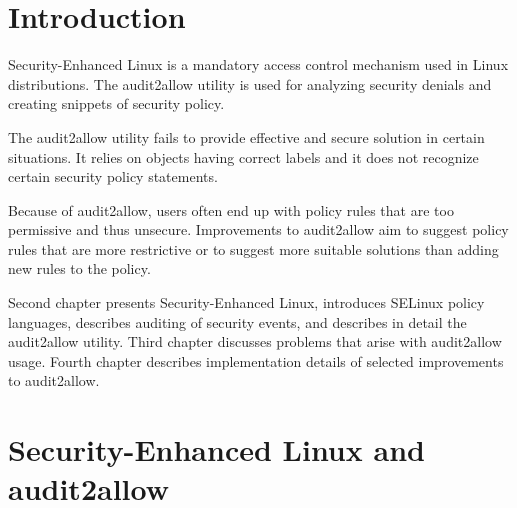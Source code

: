 \chapter{Introduction}

Security-Enhanced Linux is a mandatory access control mechanism used in Linux
distributions. The audit2allow utility is used for analyzing security denials
and creating snippets of security policy.

The audit2allow utility fails to provide effective and secure solution in
certain situations. It relies on objects having correct labels and it does not
recognize certain security policy statements.

Because of audit2allow, users often end up with policy rules that are too
permissive and thus unsecure.
Improvements to audit2allow aim to suggest policy rules that are more
restrictive or to suggest more suitable solutions than adding new rules to the
policy.

Second chapter presents Security-Enhanced Linux, introduces SELinux policy
languages, describes auditing of security events, and describes in detail the
audit2allow utility. Third chapter discusses problems that arise with
audit2allow usage. Fourth chapter describes implementation details of selected
improvements to audit2allow.

\chapter{Security-Enhanced Linux and audit2allow}

